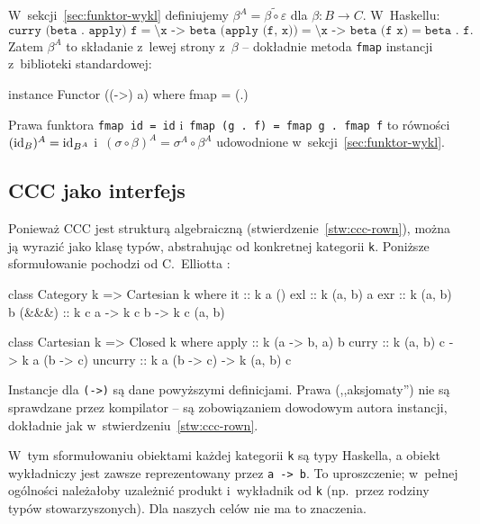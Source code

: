 \begin{przyklad}
W~sekcji~\ref{sec:funktor-wykl} definiujemy $\beta^A = \widetilde{\beta\circ\varepsilon}$ dla $\beta\colon B\to C$. W~Haskellu:
\[
\texttt{curry (beta . apply) f} = \texttt{\textbackslash x -> beta (apply (f, x))} = \texttt{\textbackslash x -> beta (f x)} = \texttt{beta . f}.
\]
Zatem $\beta^A$ to składanie z~lewej strony z~$\beta$ -- dokładnie metoda \lstinline{fmap} instancji z~biblioteki standardowej:
\begin{haskell}
instance Functor ((->) a) where
  fmap = (.)
\end{haskell}
Prawa funktora \lstinline{fmap id = id} i~\lstinline{fmap (g . f) = fmap g . fmap f} to równości $(\mathrm{id}_B)^A = \mathrm{id}_{B^A}$ i~$(\sigma\circ\beta)^A = \sigma^A\circ\beta^A$ udowodnione w~sekcji~\ref{sec:funktor-wykl}.
\end{przyklad}

\subsection*{CCC jako interfejs}

Ponieważ CCC jest strukturą algebraiczną (stwierdzenie~\ref{stw:ccc-rown}), można ją wyrazić jako klasę typów, abstrahując od konkretnej kategorii \lstinline{k}. Poniższe sformułowanie pochodzi od C.~Elliotta \cite{tk-elliott17}:
\begin{haskell}
class Category k => Cartesian k where
  it    :: k a ()
  exl   :: k (a, b) a
  exr   :: k (a, b) b
  (&&&) :: k c a -> k c b -> k c (a, b)

class Cartesian k => Closed k where
  apply   :: k (a -> b, a) b
  curry   :: k (a, b) c -> k a (b -> c)
  uncurry :: k a (b -> c) -> k (a, b) c
\end{haskell}
Instancje dla \lstinline{(->)} są dane powyższymi definicjami. Prawa (,,aksjomaty'') nie są sprawdzane przez kompilator -- są zobowiązaniem dowodowym autora instancji, dokładnie jak w~stwierdzeniu~\ref{stw:ccc-rown}.

\begin{uwaga}
W~tym sformułowaniu obiektami każdej kategorii \lstinline{k} są typy Haskella, a obiekt wykładniczy jest zawsze reprezentowany przez \lstinline{a -> b}. To uproszczenie; w~pełnej ogólności należałoby uzależnić produkt i~wykładnik od \lstinline{k} (np.\ przez rodziny typów stowarzyszonych). Dla naszych celów nie ma to znaczenia.
\end{uwaga}

